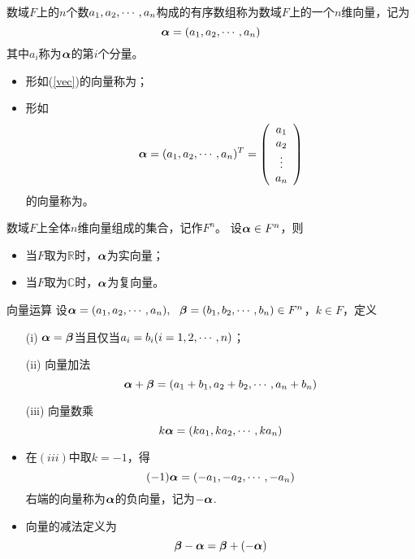 \begin{dingyi}[$n$维向量]
  数域$F$上的$n$个数$a_1,a_2,\cdots,a_n$构成的有序数组称为数域$F$上的一个$n$维向量，记为
  \begin{equation}\label{vec}
    \boldsymbol{\alpha} = (a_1, a_2, \cdots, a_n)
  \end{equation}
  其中$a_i$称为$\boldsymbol{\alpha}$的第$i$个分量。
\end{dingyi}


\begin{itemize}
\item 形如(\ref{vec})的向量称为；
\item 形如
  $$
  \boldsymbol{\alpha} = (a_1, a_2, \cdots, a_n)^T = \left(
  \begin{array}{c}
    a_1\\
    a_2\\
    \vdots\\
    a_n
  \end{array}
  \right)
  $$
  的向量称为。
\end{itemize}


数域$F$上全体$n$维向量组成的集合，记作$F^n$。 设$\boldsymbol{\alpha}\in F^n$，则
\begin{itemize}
\item 当$F$取为$\mathbb R$时，$\boldsymbol{\alpha}$为实向量；
\item 当$F$取为$\mathbb C$时，$\boldsymbol{\alpha}$为复向量。
\end{itemize}






\begin{dingyi}{向量运算}
  设$\boldsymbol{\alpha}=(a_1,a_2,\cdots,a_n),~~\boldsymbol{\beta}=(b_1,b_2,\cdots,b_n)\in F^n$，$k\in F$，定义
  \begin{enumerate}
  \item[(i)]
    $\boldsymbol{\alpha}=\boldsymbol{\beta}$当且仅当$a_i=b_i(i=1,2,\cdots,n)$；
  \item[(ii)] 向量加法
    $$
    \boldsymbol{\alpha}+\boldsymbol{\beta}=(a_1+b_1,a_2+b_2,\cdots,a_n+b_n)
    $$
  \item[(iii)] 向量数乘
    $$
    k\boldsymbol{\alpha}=(ka_1,ka_2,\cdots,ka_n)
    $$
  \end{enumerate}
\end{dingyi}


\begin{itemize}
\item 在$(iii)$中取$k=-1$，得
  $$
  (-1)\boldsymbol{\alpha} = (-a_1,-a_2,\cdots,-a_n)
  $$
  右端的向量称为$\boldsymbol{\alpha}$的负向量，记为$-\boldsymbol{\alpha}$. 
\item 向量的减法定义为
  $$
  \boldsymbol{\beta}-\boldsymbol{\alpha} = \boldsymbol{\beta} + (-\boldsymbol{\alpha})
  $$
\end{itemize}


